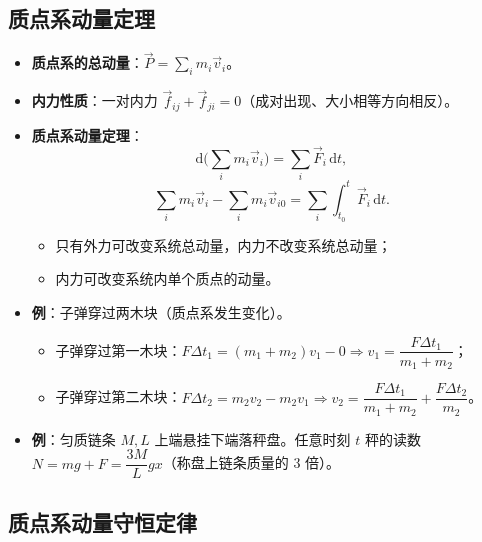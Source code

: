 \documentclass[12pt,a4paper]{ctexart}
\begin{document}
\subsection{质点系动量定理}

\begin{itemize}
    \item \textbf{质点系的总动量}：$\vec{P} = \sum_i m_i\vec{v}_i$。
    \item \textbf{内力性质}：一对内力 $\vec{f}_{ij} + \vec{f}_{ji} = 0$（成对出现、大小相等方向相反）。
    \item \textbf{质点系动量定理}：
    \[
        \mathrm{d}\biggl(\sum_i m_i\vec{v}_i\biggr) = \sum_i \vec{F}_i\,\mathrm{d}t,
    \]
    \[
        \sum_i m_i\vec{v}_i - \sum_i m_i\vec{v}_{i0} = \sum_i \int_{t_0}^{t}\vec{F}_i\,\mathrm{d}t.
    \]
    \begin{itemize}
        \item 只有外力可改变系统总动量，内力不改变系统总动量；
        \item 内力可改变系统内单个质点的动量。
    \end{itemize}
    \item \textbf{例}：子弹穿过两木块（质点系发生变化）。
    \begin{itemize}
        \item 子弹穿过第一木块：$F\Delta t_1 = (m_1 + m_2)v_1 - 0 \Rightarrow v_1 = \dfrac{F\Delta t_1}{m_1 + m_2}$；
        \item 子弹穿过第二木块：$F\Delta t_2 = m_2 v_2 - m_2 v_1 \Rightarrow v_2 = \dfrac{F\Delta t_1}{m_1 + m_2} + \dfrac{F\Delta t_2}{m_2}$。
    \end{itemize}
    \item \textbf{例}：匀质链条 $M, L$ 上端悬挂下端落秤盘。任意时刻 $t$ 秤的读数 $N = mg + F = \dfrac{3M}{L}gx$（称盘上链条质量的 3 倍）。
\end{itemize}

\subsection{质点系动量守恒定律}
\end{document}
